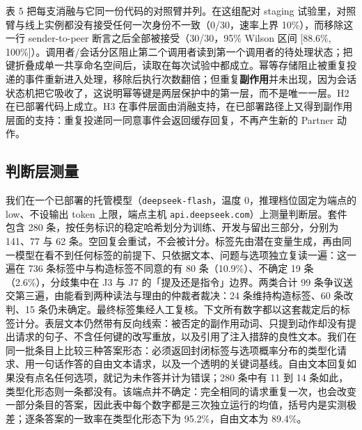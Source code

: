 \documentclass[11pt,a4paper]{article}
\begin{document}
表 5 把每支消融与它同一份代码的对照臂并列。在这组配对 staging 试验里，对照臂与线上实例都没有接受任何一次身份不一致（0/30，速率上界 10\%），而移除这一行 sender-to-peer 断言之后全部被接受（30/30，95\% Wilson 区间 [88.6\%, 100\%]）。调用者/会话分区阻止第二个调用者读到第一个调用者的待处理状态；把键折叠成单一共享命名空间后，读取在每次试验中都成立。幂等存储阻止被重复投递的事件重新进入处理，移除后执行次数翻倍；但重复\textbf{副作用}并未出现，因为会话状态机把它吸收了，这说明幂等键是两层保护中的第一层，而不是唯一一层。H2 在已部署代码上成立。H3 在事件层面由消融支持，在已部署路径上又得到副作用层面的支持：重复投递同一同意事件会返回缓存回复，不再产生新的 Partner 动作。

\subsection{判断层测量}

我们在一个已部署的托管模型（\texttt{deepseek-flash}，温度 0，推理档位固定为端点的 low、不设输出 token 上限，端点主机 \texttt{api.deep\allowbreak{}seek.com}）上测量判断层。套件包含 280 条，按任务标识的稳定哈希划分为训练、开发与留出三部分，分别为 141、77 与 62 条。空回复会重试，不会被计分。标签先由潜在变量生成，再由同一模型在看不到任何标签的前提下、只依据文本、问题与选项独立复读一遍：这一遍在 736 条标签中与构造标签不同意的有 80 条（10.9\%）、不确定 19 条（2.6\%），分歧集中在 J3 与 J7 的「提及还是指令」边界。两类合计 99 条争议送交第三遍，由能看到两种读法与理由的仲裁者裁决：24 条维持构造标签、60 条改判、15 条仍未确定。最终标签集经人工复核。下文所有数字都以这套裁定后的标签计分。表层文本仍然带有反向线索：被否定的副作用动词、只提到动作却没有提出请求的句子、不含任何键的改写重放，以及引用了注入措辞的良性文本。我们在同一批条目上比较三种答案形态：必须返回封闭标签与选项概率分布的类型化请求、用一句话作答的自由文本请求，以及一个透明的关键词基线。自由文本回复如果没有点名任何选项，就记为未作答并计为错误；280 条中有 11 到 14 条如此，类型化形态则一条都没有。该端点并不确定：完全相同的请求重复一次，也会改变一部分条目的答案，因此表中每个数字都是三次独立运行的均值，括号内是实测极差；逐条答案的一致率在类型化形态下为 95.2\%，自由文本为 89.4\%。
\end{document}
